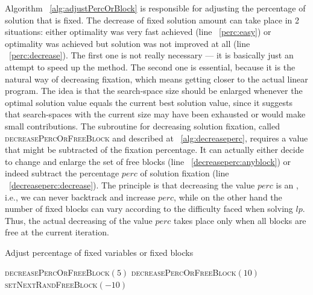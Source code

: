 Algorithm ~\ref{alg:adjustPercOrBlock} is responsible for adjusting the percentage of solution that is fixed. The decrease of fixed solution amount can take place in 2 situations: either optimality was very fast achieved (line ~\ref{perc:easy}) or optimality was achieved but solution was not improved at all (line ~\ref{perc:decrease}). The first one is not really necessary --- it is basically just an attempt to speed up the method. The second one is essential, because it is the natural way of decreasing fixation, which means getting closer to the actual linear program. The idea is that the search-space size should be enlarged whenever the optimal solution value equals the current best solution value, since it suggests that search-spaces with the current size may have been exhausted or would make small contributions. The subroutine for decreasing solution fixation, called \textsc{decreasePercOrFreeBlock} and described at ~\ref{alg:decreaseperc}, requires a value that might be subtracted of the fixation percentage. It can actually either decide to change and enlarge the set of free blocks (line ~\ref{decreaseperc:anyblock}) or indeed subtract the percentage $perc$ of solution fixation (line ~\ref{decreaseperc:decrease}). The principle is that decreasing the value $perc$ is an , i.e., we can never backtrack and increase $perc$, while on the other hand the number of fixed blocks can vary according to the difficulty faced when solving $lp$. Thus, the actual decreasing of the value $perc$ takes place only when all blocks are free at the current iteration.


\begin{algorithm}[H]
  \caption{Adjust percentage of fixed variables or fixed blocks
    \label{alg:adjustPercOrBlock}}
  \begin{algorithmic}[1]
			 \label{perc:easy} %
				\State \textsc{decreasePercOrFreeBlock}$(5)$	
			\Else 
					  	\label{perc:decrease}	%
					\State \textsc{decreasePercOrFreeBlock}$(10)$		
				\EndIf	
			\EndIf
    \EndProcedure	
	  \Statex
    				\label{alg:decreaseperc}
				\Return
			\EndIf
													\label{decreaseperc:anyblock}
				\State \textsc{setNextRandFreeBlock}$(-10)$
				\Return
			\EndIf
													\label{decreaseperc:decrease}
    \EndProcedure
  \end{algorithmic}
\end{algorithm}

